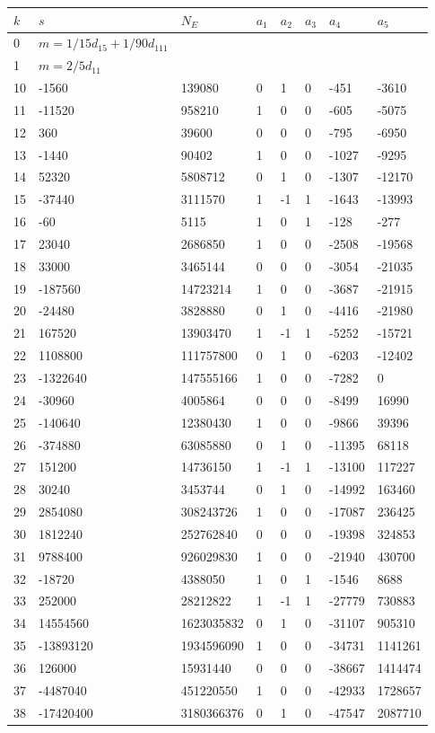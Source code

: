 \documentclass{amsart}
\begin{document}
\begin{longtable}{|l|l|l|lllll|}
\hline
$k$ & $s$ & $N_E$ & $a_1$ & $a_2$ & $a_3$ & $a_4$ & $a_5$\\
\hline
0&$m=1/15d_{15}+1/90d_{111}$&&\multicolumn{5}{c|}{}\\
1&$m=2/5d_{11}$&&\multicolumn{5}{c|}{}\\
10&-1560&139080&0&1&0&-451&-3610\\
11&-11520&958210&1&0&0&-605&-5075\\
12&360&39600&0&0&0&-795&-6950\\
13&-1440&90402&1&0&0&-1027&-9295\\
14&52320&5808712&0&1&0&-1307&-12170\\
15&-37440&3111570&1&-1&1&-1643&-13993\\
16&-60&5115&1&0&1&-128&-277\\
17&23040&2686850&1&0&0&-2508&-19568\\
18&33000&3465144&0&0&0&-3054&-21035\\
19&-187560&14723214&1&0&0&-3687&-21915\\
20&-24480&3828880&0&1&0&-4416&-21980\\
21&167520&13903470&1&-1&1&-5252&-15721\\
22&1108800&111757800&0&1&0&-6203&-12402\\
23&-1322640&147555166&1&0&0&-7282&0\\
24&-30960&4005864&0&0&0&-8499&16990\\
25&-140640&12380430&1&0&0&-9866&39396\\
26&-374880&63085880&0&1&0&-11395&68118\\
27&151200&14736150&1&-1&1&-13100&117227\\
28&30240&3453744&0&1&0&-14992&163460\\
29&2854080&308243726&1&0&0&-17087&236425\\
30&1812240&252762840&0&0&0&-19398&324853\\
31&9788400&926029830&1&0&0&-21940&430700\\
32&-18720&4388050&1&0&1&-1546&8688\\
33&252000&28212822&1&-1&1&-27779&730883\\
34&14554560&1623035832&0&1&0&-31107&905310\\
35&-13893120&1934596090&1&0&0&-34731&1141261\\
36&126000&15931440&0&0&0&-38667&1414474\\
37&-4487040&451220550&1&0&0&-42933&1728657\\
38&-17420400&3180366376&0&1&0&-47547&2087710\\

\end{longtable}
\end{document}
